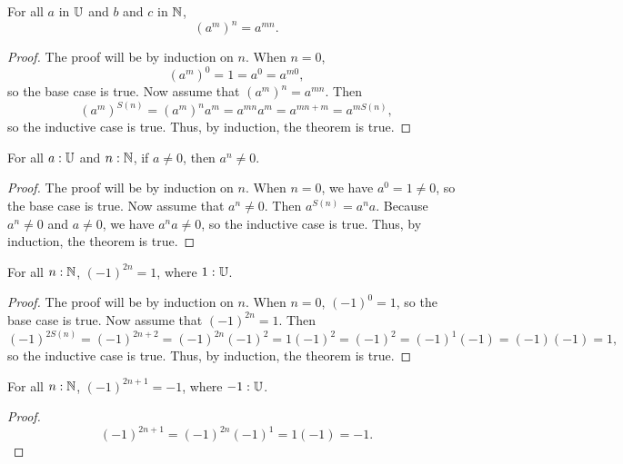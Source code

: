\documentclass[../math.tex]{subfiles}
\begin{document}
\begin{theorem}
    For all $a$ in $\mathbb{U}$ and $b$ and $c$ in $\mathbb{N}$,
    \[
        (a^m)^n = a^{mn}.
    \]
\end{theorem}
\begin{proof}
    The proof will be by induction on $n$.  When $n = 0$,
    \[
        (a^m)^0 = 1 = a^0 = a^{m0},
    \]
    so the base case is true.  Now assume that $(a^m)^n = a^{mn}$.  Then
    \[
        (a^m)^{S(n)} = (a^m)^n a^m = a^{mn} a^m = a^{mn + m} = a^{mS(n)},
    \]
    so the inductive case is true.  Thus, by induction, the theorem is true.
\end{proof}

\begin{theorem} \label{nat_pow_not_zero}
    For all $a : \mathbb{U}$ and $n : \mathbb{N}$, if $a \neq 0$, then $a^n \neq 0$.
\end{theorem}
\begin{proof}
    The proof will be by induction on $n$.  When $n = 0$, we have $a^0 = 1 \neq
    0$, so the base case is true.  Now assume that $a^n \neq 0$.  Then $a^{S(n)}
    = a^na.$  Because $a^n \neq 0$ and $a \neq 0$, we have $a^na \neq 0$, so the
    inductive case is true.  Thus, by induction, the theorem is true.
\end{proof}

\begin{theorem} \label{nat_pow_neg_even}
    For all $n : \mathbb{N}$, $(-1)^{2n} = 1$, where $1 : \mathbb{U}$.
\end{theorem}
\begin{proof}
    The proof will be by induction on $n$.  When $n = 0$, $(-1)^0 = 1$, so the
    base case is true.  Now assume that $(-1)^{2n} = 1$.  Then
    \[
        (-1)^{2S(n)} = (-1)^{2n + 2} = (-1)^{2n} (-1)^2 = 1 (-1)^2 = (-1)^2 =
        (-1)^1 (-1) = (-1) (-1) = 1,
    \]
    so the inductive case is true.  Thus, by induction, the theorem is true.
\end{proof}

\begin{theorem} \label{nat_pow_neg_odd}
    For all $n : \mathbb{N}$, $(-1)^{2n + 1} = -1$, where $-1 : \mathbb{U}$.
\end{theorem}
\begin{proof}
    \[
        (-1)^{2n + 1} = (-1)^{2n} (-1)^1 = 1 (-1) = -1.
    \]
\end{proof}
\end{document}
